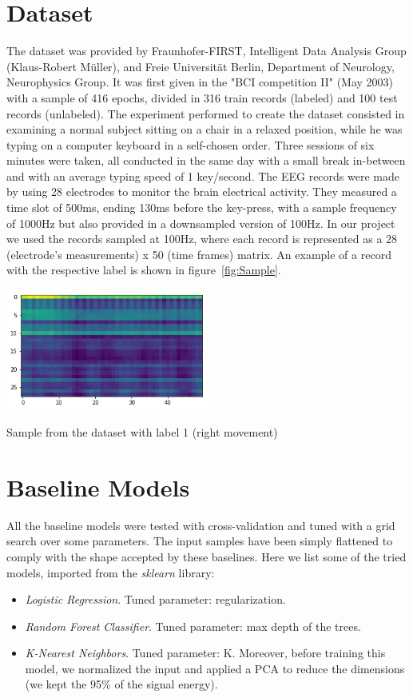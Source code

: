 \documentclass[10pt,conference,compsocconf]{IEEEtran}
\begin{document}
\section{Dataset}
\label{sec:data-analysis}
The dataset was provided by Fraunhofer-FIRST, Intelligent Data Analysis Group (Klaus-Robert M\"uller), and Freie Universit\"at Berlin, Department of Neurology, Neurophysics Group. It was first given in the "BCI competition II" (May 2003) with a sample of 416 epochs, divided in 316 train records (labeled) and 100 test records (unlabeled).
The experiment performed to create the dataset consisted in examining a normal subject sitting on a chair in a relaxed position, while he was typing on a computer keyboard in a self-chosen order. Three sessions of six minutes were taken, all conducted in the same day with a small break in-between and with an average typing speed of 1 key/second. The EEG records were made by using 28 electrodes to monitor the brain electrical activity. They measured a time slot of 500ms, ending 130ms before the key-press, with a sample frequency of 1000Hz but also provided in a downsampled version of 100Hz. In our project we used the records sampled at 100Hz, where each record is represented as a 28 (electrode's measurements) x 50 (time frames) matrix. 
An example of a record with the respective label is shown in figure~\ref{fig:Sample}.

\begin{center}
	\captionsetup{type=figure}
	\includegraphics[width=0.5\textwidth]{img/sample.png}
	\caption {Sample from the dataset with label 1 (right movement)}
	\label{fig:Sample}
\end{center}


\section{Baseline Models}
\label{sec:baseline}
All the baseline models were tested with cross-validation and tuned with a grid search over some parameters. The input samples have been simply flattened to comply with the shape accepted by these baselines. Here we list some of the tried models, imported from the \textit{sklearn} library:
\begin{itemize}
\item \textit{Logistic Regression}. Tuned parameter: regularization. 
\item \textit{Random Forest Classifier}. Tuned parameter: max depth of the trees.
\item \textit{K-Nearest Neighbors}. Tuned parameter: K. Moreover, before training this model, we normalized the input and applied a PCA to reduce the dimensions (we kept the 95\% of the signal energy).
\end{itemize}
\end{document}
